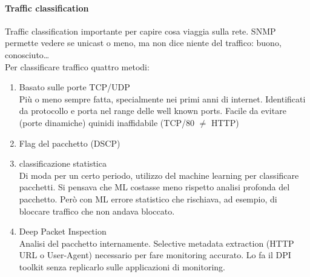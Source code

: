 \documentclass[10pt]{book}
\begin{document}
\paragraph{Traffic classification} Traffic classification importante per capire cosa viaggia sulla rete. SNMP permette vedere se unicast o meno, ma non dice niente del traffico: buono, conosciuto\ldots\\
Per classificare traffico quattro metodi:
\begin{enumerate}
	\item Basato sulle porte TCP/UDP\\
	Più o meno sempre fatta, specialmente nei primi anni di internet. Identificati da protocollo e porta nel range delle well known ports. Facile da evitare (porte dinamiche) quinidi inaffidabile (TCP/80 $\neq$ HTTP)
	\item Flag del pacchetto (DSCP)\\
	
	\item classificazione statistica\\
	Di moda per un certo periodo, utilizzo del machine learning per classificare pacchetti. Si pensava che ML costasse meno rispetto analisi profonda del pacchetto. Però con ML errore statistico che rischiava, ad esempio, di bloccare traffico che non andava bloccato.
	\item Deep Packet Inspection\\
	Analisi del pacchetto internamente. Selective metadata extraction (HTTP URL o User-Agent) necessario per fare monitoring accurato. Lo fa il DPI toolkit senza replicarlo sulle applicazioni di monitoring.
\end{enumerate}
\end{document}
